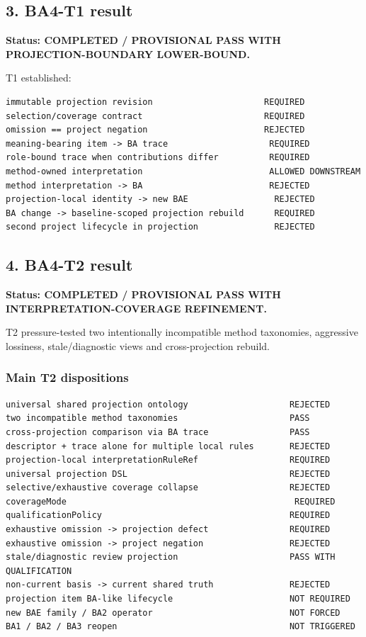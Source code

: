 \documentclass[11pt,a4paper]{article}
\begin{document}
\subsection{3. BA4-T1 result}\label{3-ba4-t1-result}

\textbf{Status: COMPLETED / PROVISIONAL PASS WITH PROJECTION-BOUNDARY
LOWER-BOUND.}

T1 established:

\begin{verbatim}
immutable projection revision                      REQUIRED
selection/coverage contract                        REQUIRED
omission == project negation                       REJECTED
meaning-bearing item -> BA trace                    REQUIRED
role-bound trace when contributions differ          REQUIRED
method-owned interpretation                         ALLOWED DOWNSTREAM
method interpretation -> BA                         REJECTED
projection-local identity -> new BAE                 REJECTED
BA change -> baseline-scoped projection rebuild      REQUIRED
second project lifecycle in projection               REJECTED
\end{verbatim}

\subsection{4. BA4-T2 result}\label{4-ba4-t2-result}

\textbf{Status: COMPLETED / PROVISIONAL PASS WITH
INTERPRETATION-COVERAGE REFINEMENT.}

T2 pressure-tested two intentionally incompatible method taxonomies,
aggressive lossiness, stale/diagnostic views and cross-projection
rebuild.

\subsubsection{Main T2 dispositions}\label{main-t2-dispositions}

\begin{verbatim}
universal shared projection ontology                    REJECTED
two incompatible method taxonomies                      PASS
cross-projection comparison via BA trace                PASS
descriptor + trace alone for multiple local rules       REJECTED
projection-local interpretationRuleRef                  REQUIRED
universal projection DSL                                REJECTED
selective/exhaustive coverage collapse                  REJECTED
coverageMode                                             REQUIRED
qualificationPolicy                                     REQUIRED
exhaustive omission -> projection defect                REQUIRED
exhaustive omission -> project negation                 REJECTED
stale/diagnostic review projection                      PASS WITH QUALIFICATION
non-current basis -> current shared truth               REJECTED
projection item BA-like lifecycle                       NOT REQUIRED
new BAE family / BA2 operator                           NOT FORCED
BA1 / BA2 / BA3 reopen                                  NOT TRIGGERED
\end{verbatim}
\end{document}

